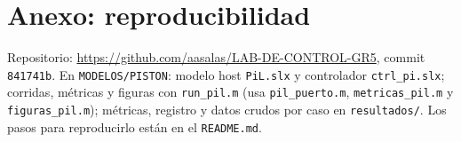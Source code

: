\documentclass[conference]{IEEEtran}
\begin{document}
\appendix
\section*{Anexo: reproducibilidad}
Repositorio: \url{https://github.com/aasalas/LAB-DE-CONTROL-GR5}, commit \texttt{841741b}. En \texttt{MODELOS/PISTON}: modelo host \texttt{PiL.slx} y controlador \texttt{ctrl\_pi.slx}; corridas, métricas y figuras con \texttt{run\_pil.m} (usa \texttt{pil\_puerto.m}, \texttt{metricas\_pil.m} y \texttt{figuras\_pil.m}); métricas, registro y datos crudos por caso en \texttt{resultados/}. Los pasos para reproducirlo están en el \texttt{README.md}.
\end{document}

